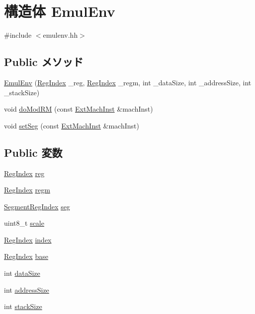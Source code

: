 \hypertarget{structX86ISA_1_1EmulEnv}{
\section{構造体 EmulEnv}
\label{structX86ISA_1_1EmulEnv}
}


{\ttfamily \#include $<$emulenv.hh$>$}\subsection*{Public メソッド}
\begin{DoxyCompactItemize}
\item 
\hyperlink{structX86ISA_1_1EmulEnv_a150178afb4bf886ad49be8f31f98e14b}{EmulEnv} (\hyperlink{namespaceX86ISA_a69329e1d929a534ff51be6cf8216b69a}{RegIndex} \_\-reg, \hyperlink{namespaceX86ISA_a69329e1d929a534ff51be6cf8216b69a}{RegIndex} \_\-regm, int \_\-dataSize, int \_\-addressSize, int \_\-stackSize)
\item 
void \hyperlink{structX86ISA_1_1EmulEnv_ae8a901694f1a63aaa9cf3c28faabe4ed}{doModRM} (const \hyperlink{structX86ISA_1_1ExtMachInst}{ExtMachInst} \&machInst)
\item 
void \hyperlink{structX86ISA_1_1EmulEnv_a1551fe2bf04bbf608dbcf23167211192}{setSeg} (const \hyperlink{structX86ISA_1_1ExtMachInst}{ExtMachInst} \&machInst)
\end{DoxyCompactItemize}
\subsection*{Public 変数}
\begin{DoxyCompactItemize}
\item 
\hyperlink{namespaceX86ISA_a69329e1d929a534ff51be6cf8216b69a}{RegIndex} \hyperlink{structX86ISA_1_1EmulEnv_ab3cfff93a9eaf4043816e6667f4f4b5c}{reg}
\item 
\hyperlink{namespaceX86ISA_a69329e1d929a534ff51be6cf8216b69a}{RegIndex} \hyperlink{structX86ISA_1_1EmulEnv_a23102d8465dd60d680f731af9a84f689}{regm}
\item 
\hyperlink{namespaceX86ISA_acea32b07c2303d31296b1c07a16c4795}{SegmentRegIndex} \hyperlink{structX86ISA_1_1EmulEnv_af746478528438f57577dbfd5f772079e}{seg}
\item 
uint8\_\-t \hyperlink{structX86ISA_1_1EmulEnv_a616c0a72f0e4af38b93c736773ac7210}{scale}
\item 
\hyperlink{namespaceX86ISA_a69329e1d929a534ff51be6cf8216b69a}{RegIndex} \hyperlink{structX86ISA_1_1EmulEnv_a4873352bf9ab22e599f727e0140b6cc0}{index}
\item 
\hyperlink{namespaceX86ISA_a69329e1d929a534ff51be6cf8216b69a}{RegIndex} \hyperlink{structX86ISA_1_1EmulEnv_acd7cdac3bd7929336e8da2a081692dc3}{base}
\item 
int \hyperlink{structX86ISA_1_1EmulEnv_a8c8e474bb8d2c6f7162455416b488e50}{dataSize}
\item 
int \hyperlink{structX86ISA_1_1EmulEnv_a634857712134690946c76d27713b6fa4}{addressSize}
\item 
int \hyperlink{structX86ISA_1_1EmulEnv_aa19ead659daf6b0a04ef9cd9ad3f1d8d}{stackSize}
\end{DoxyCompactItemize}


